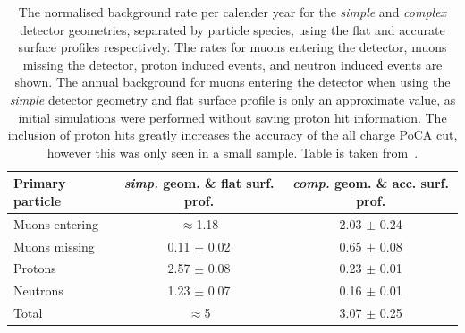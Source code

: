 \begin{table}
  \caption[The normalised background rate per calender year for the \emph{simple} detector geometry and flat surface profile, and for the \emph{complex} geometry and accurate surface profile]
          {The normalised background rate per calender year for the \emph{simple} and \emph{complex} detector geometries, separated by particle species, using the flat and accurate surface profiles respectively. The rates for muons entering the detector, muons missing the detector, proton induced events, and neutron induced events are shown. The annual background for muons entering the detector when using the \emph{simple} detector geometry and flat surface profile is only an approximate value, as initial simulations were performed without saving proton hit information. The inclusion of proton hits greatly increases the accuracy of the all charge PoCA cut, however this was only seen in a small sample. Table is taken from~\citep{MartinsThesis}.}
  \centering
  \label{tab:FinalSurfRates}
  \begin{tabular}{l c c}
    \toprule
        {Primary particle} & {\emph{simp.} geom. \& flat surf. prof.} & {\emph{comp.} geom. \& acc. surf. prof.} \\ 
        \midrule
        Muons entering     & $\approx$1.18     & 2.03 $\pm$ 0.24 \\

        Muons missing      & 0.11 $\pm$ 0.02   & 0.65 $\pm$ 0.08 \\

        Protons            & 2.57 $\pm$ 0.08   & 0.23 $\pm$ 0.01 \\

        Neutrons           & 1.23 $\pm$ 0.07   & 0.16 $\pm$ 0.01 \\

        Total              & $\approx$5        & 3.07 $\pm$ 0.25 \\
    \bottomrule
  \end{tabular}
\end{table}

